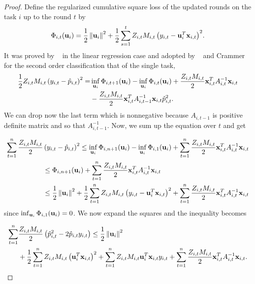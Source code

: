 \begin{proof}
Define the regularized cumulative square loss of the updated rounds on the task 
$i$ up to the round $t$ by
\begin{equation*}
\Phi_{i,t}(\mathbf{u}_i)=\frac{1}{2}\left\Vert {\mathbf{u}_i} \right\Vert^2+\frac{1}{2}\sum_{s=1}^{t}{Z_{i,t}M_{i,t}\left({y_{i,t}-\mathbf{u}_i^T\mathbf{x}_{i,t}}\right)}^2.
\end{equation*}
It was proved by ~\cite{Forster} in the linear regression case and adopted by
~\cite{cesa2006worst} and Crammer ~\cite{crammer2014doubly} for the second order classification that of the single task,
\begin{equation*}
\begin{split}
\frac{1}{2} Z_{i,t}M_{i,t}\left({y_{i,t}-\hat{p}_{i,t}}\right)^{2}= &\inf_{\mathbf{u}_i}{\Phi_{i,t+1}}(\mathbf{u}_i)-\inf_{\mathbf{u}_i}{\Phi_{i,t}}(\mathbf{u}_i)
+\frac{Z_{i,t}M_{i,t}}{2}\mathbf{x}_{i,t}^TA_{i,t}^{-1}\mathbf{x}_{i,t}\\
&-\frac{Z_{i,t}M_{i,t}}{2}\mathbf{x}_{i,t}^TA_{i,t-1}^{-1}\mathbf{x}_{i,t}\hat{p}_{i,t}^2.
\end{split}
\end{equation*} 
We can drop now the last term which is nonnegative because $A_{i,t-1}$ is 
positive definite matrix and so that $A_{i,t-1}^{-1}$.
Now, we sum up the equation over $t$ and get

\begin{equation*}
 \begin{split}
\sum_{t=1}^{n}\frac{Z_{i,t}M_{i,t}}{2}&\left({y_{i,t}-\hat{p}_{i,t}}\right)^{2} \le \inf_{\mathbf{u}_i}{\Phi_{i,n+1}}(\mathbf{u}_i)
-\inf_{\mathbf{u}_i}{\Phi_{i,1}}(\mathbf{u}_i)+\sum_{t=1}^{n}\frac{Z_{i,t}M_{i,t}}{2}\mathbf{x}_{i,t}^TA_{i,t}^{-1}\mathbf{x}_{i,t}\\
&\le  \Phi_{i,n+1}(\mathbf{u}_i)+\sum_{t=1}^{n}\frac{Z_{i,t}M_{i,t}}{2}\mathbf{x}_{i,t}^TA_{i,t}^{-1}\mathbf{x}_{i,t}\\
&\le  \frac{1}{2}\left\Vert {\mathbf{u}_i} \right\Vert^2+\frac{1}{2}\sum_{t=1}^{n}{Z_{i,t}M_{i,t}\left({y_{i,t}-\mathbf{u}_i^T\mathbf{x}_{i,t}}\right)}^2+
\sum_{t=1}^{n}\frac{Z_{i,t}M_{i,t}}{2}\mathbf{x}_{i,t}^TA_{i,t}^{-1}\mathbf{x}_{i,t}\\
\end{split}
\end{equation*} 
since $\inf_{\mathbf{u}_i}{\Phi_{i,1}}(\mathbf{u}_i)=0$. We now expand the squares and the 
inequality becomes

\begin{equation} \label{eq:so_first_step}
 \begin{split}
   \sum_{t=1}^{n}&\frac{Z_{i,t}M_{i,t}}{2}\left({\hat{p}_{i,t}^2-2\hat{p}_{i,t}y_{i,t}}\right)
   \le  \frac{1}{2}\left\Vert {\mathbf{u}_i} \right\Vert^2 \\
   &+\frac{1}{2}\sum_{t=1}^{n}{Z_{i,t}M_{i,t}\left({\mathbf{u}_i^T\mathbf{x}_{i,t}}\right)}^2 
   +\sum_{t=1}^{n}{Z_{i,t}M_{i,t}\mathbf{u}_i^T\mathbf{x}_{i,t}y_{i,t}}
+\sum_{t=1}^{n}\frac{Z_{i,t}M_{i,t}}{2}\mathbf{x}_{i,t}^TA_{i,t}^{-1}\mathbf{x}_{i,t}.\\
\end{split}
\end{equation} 


\end{proof}
